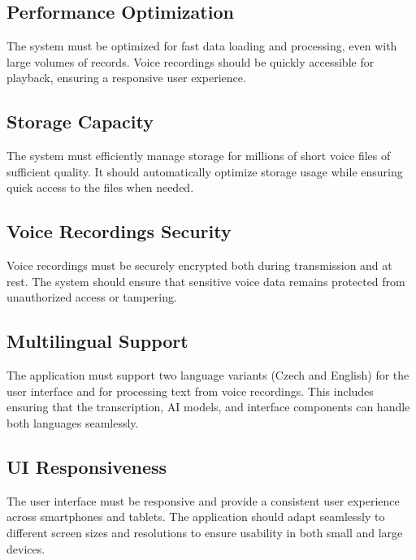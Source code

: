 \documentclass[
  digital,     %
  oneside,     %
  nosansbold,  %
  nocolorbold, %
  lof,         %
  lot,         %
]{fithesis4}
\begin{document}
\subsection{Performance Optimization}  
The system must be optimized for fast data loading and processing, even with large volumes of records. Voice recordings should be quickly accessible for playback, ensuring a responsive user experience.

\subsection{Storage Capacity}  
The system must efficiently manage storage for millions of short voice files of sufficient quality. It should automatically optimize storage usage while ensuring quick access to the files when needed.

\subsection{Voice Recordings Security}  
Voice recordings must be securely encrypted both during transmission and at rest. The system should ensure that sensitive voice data remains protected from unauthorized access or tampering.

\subsection{Multilingual Support}  
The application must support two language variants (Czech and English) for the user interface and for processing text from voice recordings. This includes ensuring that the transcription, AI models, and interface components can handle both languages seamlessly.

\subsection{UI Responsiveness}  
The user interface must be responsive and provide a consistent user experience across smartphones and tablets. The application should adapt seamlessly to different screen sizes and resolutions to ensure usability in both small and large devices.
    
\shorthandoff{-}
\begin{markdown}
   
\end{markdown}
\shorthandon{-}
\end{document}
